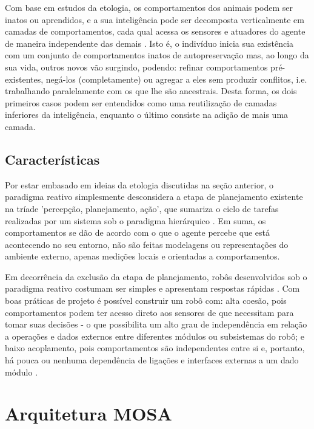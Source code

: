 Com base em estudos da etologia, os comportamentos dos animais podem ser inatos ou aprendidos, e a sua inteligência pode ser decomposta verticalmente 
em camadas de comportamentos, cada qual acessa os sensores e atuadores do agente de maneira independente das demais \cite{murphy}.
Isto é, o indivíduo inicia sua existência com um conjunto de comportamentos inatos de autopreservação mas, ao longo da sua vida, outros 
novos vão surgindo, podendo: refinar comportamentos pré-existentes, negá-los (completamente) ou agregar a eles sem produzir conflitos, 
i.e. trabalhando paralelamente com os que lhe são ancestrais.
Desta forma, os dois primeiros casos podem ser entendidos como uma reutilização de camadas inferiores da inteligência, enquanto o 
último consiste na adição de mais uma camada.

\subsection{Características}
Por estar embasado em ideias da etologia discutidas na seção anterior, o paradigma reativo simplesmente desconsidera a etapa de planejamento 
existente na tríade 'percepção, planejamento, ação', que sumariza o ciclo de tarefas realizadas por um sistema sob o paradigma hierárquico 
\cite{murphy,roseli}.
Em suma, os comportamentos se dão de acordo com o que o agente percebe que está acontecendo no seu entorno, não são feitas modelagens ou 
representações do ambiente externo, apenas medições locais e orientadas a comportamentos.

Em decorrência da exclusão da etapa de planejamento, robôs desenvolvidos sob o paradigma reativo costumam ser simples e apresentam 
respostas rápidas \cite{roseli}.
Com boas práticas de projeto é possível construir um robô com: alta coesão, pois comportamentos podem ter acesso direto aos sensores de que 
necessitam para tomar suas decisões - o que possibilita um alto grau de independência em relação a operações e dados externos entre diferentes 
módulos 
ou subsistemas do robô; e baixo acoplamento, pois comportamentos são independentes entre si e, portanto, há pouca ou nenhuma dependência de ligações 
e 
interfaces externas a um dado módulo \cite{murphy}.


\section{Arquitetura MOSA}

